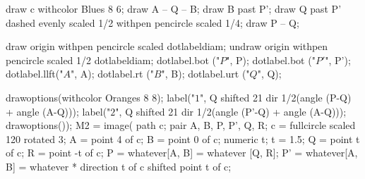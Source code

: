 \documentclass[a4paper]{scrartcl}
\begin{document}
draw c withcolor Blues 8 6;
draw A -- Q -- B;
draw B past P';
draw Q past P' dashed evenly scaled 1/2 withpen pencircle scaled 1/4;
draw P -- Q;

draw origin withpen pencircle scaled dotlabeldiam;
undraw origin withpen pencircle scaled 1/2 dotlabeldiam;
dotlabel.bot ("$P$", P);
dotlabel.bot ("$P'$", P');
dotlabel.llft("$A$", A);
dotlabel.rt  ("$B$", B);
dotlabel.urt ("$Q$", Q);

drawoptions(withcolor Oranges 8 8);
label("$\scriptscriptstyle 1$", Q shifted 21 dir 1/2(angle (P-Q) + angle (A-Q)));
label("$\scriptscriptstyle 2$", Q shifted 21 dir 1/2(angle (P'-Q) + angle (A-Q)));
drawoptions());
M2 = image(
path c; pair A, B, P, P', Q, R;
c = fullcircle scaled 120 rotated 3;
A = point 4 of c; B = point 0 of c; 
numeric t; t = 1.5;
Q = point t of c;
R = point -t of c;
P = whatever[A, B] = whatever [Q, R];
P' = whatever[A, B] = whatever * direction t of c shifted point t of c;
\end{document}
